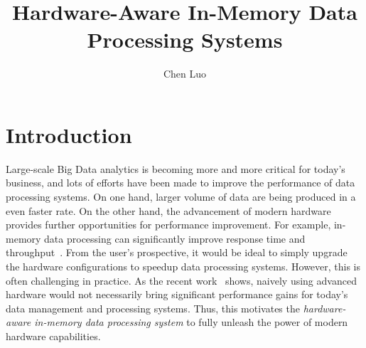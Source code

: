 \documentclass[conference]{llncs}
\title{Hardware-Aware In-Memory Data Processing Systems}
\author{Chen Luo}
\institute{}
\begin{document}
\maketitle

\section{Introduction}
Large-scale Big Data analytics is becoming more and more critical for today's business, and lots of efforts have been made to improve the performance of data processing systems.
On one hand, larger volume of data are being produced in a even faster rate.
On the other hand, the advancement of modern hardware provides further opportunities for performance improvement.
For example, in-memory data processing can significantly improve response time and throughput~\cite{in-memory2015}.
From the user's prospective, it would be ideal to simply upgrade the hardware configurations to speedup data processing systems. However, this is often challenging in practice.
As the recent work~\cite{challenge2015} shows, naively using advanced hardware would not necessarily bring significant performance gains for today's data management and processing systems.
Thus, this motivates the \emph{hardware-aware in-memory data processing system} to fully unleash the power of modern hardware capabilities.
\end{document}
